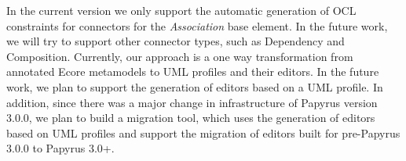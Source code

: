 In the current version we only support the automatic generation of OCL constraints for connectors for the \textit{Association} base element.
In the future work, we will try to support other connector types, such as Dependency and Composition. 
Currently, our approach is a one way transformation from annotated Ecore metamodels to UML profiles and their editors. 
In the future work, we plan to support the generation of editors based on a UML profile. 
In addition, since there was a major change in infrastructure of Papyrus version 3.0.0, we plan to build a migration tool, which uses the generation of editors based on UML profiles and support the migration of editors built for pre-Papyrus 3.0.0 to Papyrus 3.0+.
\\

